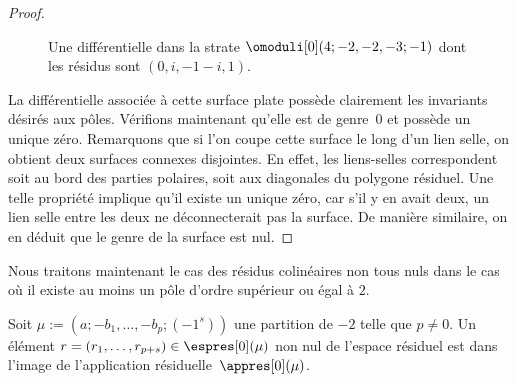 \begin{proof}
\begin{figure}[htb]
\caption{Une différentielle dans la strate $\omoduli[0](4;-2,-2,-3;-1)$ dont les résidus sont $(0,i,-1-i,1)$.} \label{fig:casgeneralgenrezero}
\end{figure}

La différentielle associée à cette surface plate possède clairement les invariants désirés aux pôles. Vérifions maintenant qu'elle est de genre~$0$ et possède un unique zéro. Remarquons que si l'on coupe cette surface le long d'un lien selle, on obtient deux surfaces connexes disjointes. En effet, les liens-selles correspondent soit au bord des parties polaires, soit aux diagonales du polygone résiduel. Une telle propriété implique qu'il existe un unique zéro, car s'il y en avait deux, un lien selle entre les deux ne déconnecterait pas la surface. De manière similaire, on en déduit que le genre de la surface est nul.
\end{proof}

Nous traitons maintenant le cas des résidus colinéaires non tous nuls dans le cas où il existe au moins un pôle d'ordre supérieur ou égal à $2$.
\begin{lem}\label{lem:gzerogen2}
Soit $\mu:=(a;-b_{1},\dots,-b_{p};(-1^{s}))$ une partition de $-2$ telle que $p\neq0$. Un élément $r=(r_{1}, \dots , r_{p+s})\in\espres[0](\mu)$
non nul de l’espace résiduel est dans l’image de l'application résiduelle~$\appres[0](\mu)$.
\end{lem}


